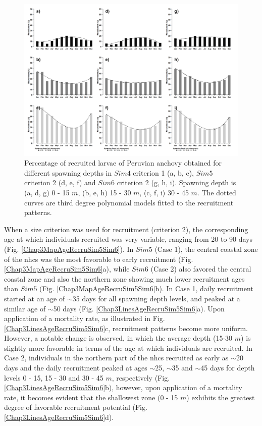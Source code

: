 \begin{figure}[H]
	\includegraphics[width=1.0\textwidth]{figures/Chap3DepthLevels.png}
	\centering
	\caption{Percentage of recruited larvae of Peruvian anchovy obtained for different spawning depths in $Sim 4$ criterion 1 (a, b, c), $Sim 5$ criterion 2 (d, e, f) and $Sim 6$ criterion 2 (g, h, i). Spawning depth is (a, d, g) 0 - 15 $m$, (b, e, h) 15 - 30 $m$, (c, f, i) 30 - 45 $m$. The dotted curves are third degree polynomial models fitted to the recruitment patterns.}
	\label{Chap3DepthLevels}
\end{figure}

When a size criterion was used for recruitment (criterion 2), the corresponding age at which individuals recruited was very variable, ranging from 20 to 90 days (Fig. \ref{Chap3MapAgeRecruSim5Sim6}). In $Sim 5$ (Case 1), the central coastal zone of the \acrshort{nhcs} was the most favorable to early recruitment (Fig. \ref{Chap3MapAgeRecruSim5Sim6}a), while $Sim 6$ (Case 2) also favored the central coastal zone and also the northern zone showing much lower recruitment ages than $Sim 5$ (Fig. \ref{Chap3MapAgeRecruSim5Sim6}b). In Case 1, daily recruitment started at an age of $\sim$35 days for all spawning depth levels, and peaked at a similar age of $\sim$50 days (Fig. \ref{Chap3LinesAgeRecruSim5Sim6}a). Upon application of a mortality rate, as illustrated in Fig. \ref{Chap3LinesAgeRecruSim5Sim6}c, recruitment patterns become more uniform. However, a notable change is observed, in which the average depth (15-30 $m$) is slightly more favorable in terms of the age at which individuals are recruited. In Case 2, individuals in the northern part of the \acrshort{nhcs} recruited as early as $\sim$20 days and the daily recruitment peaked at ages $\sim$25, $\sim$35 and $\sim$45 days for depth levels 0 - 15, 15 - 30 and 30 - 45 $m$, respectively (Fig. \ref{Chap3LinesAgeRecruSim5Sim6}b), however, upon application of a mortality rate, it becomes evident that the shallowest zone (0 - 15 $m$) exhibits the greatest degree of favorable recruitment potential (Fig. \ref{Chap3LinesAgeRecruSim5Sim6}d).\\

